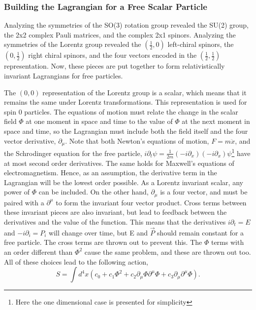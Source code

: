 \subsubsection{Building the Lagrangian for a Free Scalar Particle}

Analyzing the symmetries of the SO(3) rotation group revealed the SU(2) group, the 2x2 complex Pauli matrices, and the complex 2x1 spinors. Analyzing the symmetries of the Lorentz group revealed the $(\frac{1}{2}, 0)$ left-chiral spinors, the $(0, \frac{1}{2})$ right chiral spinors, and the four vectors encoded in the $(\frac{1}{2}, \frac{1}{2})$ representation. Now, these pieces are put together to form relativistically invariant Lagrangians for free particles.  

The $(0,0)$ representation of the Lorentz group is a scalar, which means that it remains the same under Lorentz transformations. This representation is used for spin 0 particles. The equations of motion must relate the change in the scalar field $\Phi$ at one moment in space and time to the value of $\Phi$ at the next moment in space and time, so the Lagrangian must include both the field itself and the four vector derivative, $\partial_\mu$. Note that both Newton's equations of motion, $F=m\ddot{x}$, and the Schrodinger equation for the free particle, $i\partial_t\psi = \frac{1}{2m}(-i\partial_x)(-i\partial_x)\psi$\footnote{Here the one dimensional case is presented for simplicity} have at most second order derivatives. The same holds for Maxwell's equations of electromagnetism. Hence, as an assumption, the derivative term in the Lagrangian will be the lowest order possible. As a Lorentz invariant scalar, any power of $\Phi$ can be included. On the other hand, $\partial_\mu$ is a four vector, and must be paired with a $\partial^\mu$ to form the invariant four vector product. Cross terms between these invariant pieces are also invariant, but lead to feedback between the derivatives and the value of the function. This means that the derivatives $i\partial_t = E$ and $-i\partial_i = P_i$ will change over time, but E and $\vec{P}$ should remain constant for a free particle. The cross terms are thrown out to prevent this. The $\Phi$ terms with an order different than $\Phi^2$ cause the same problem, and these are thrown out too. All of these choices lead to the following action, 
\begin{equation}
S = \int d^4x \left(c_0 + c_1 \Phi^2  
+ c_2 \partial_\mu\Phi\partial^\mu\Phi + c_3 \partial_\mu \partial^\mu \Phi\right).
\end{equation}

